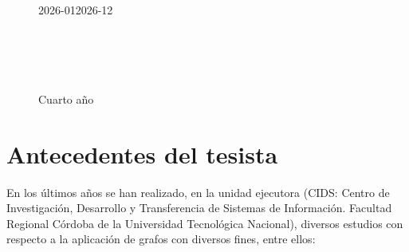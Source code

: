 \documentclass[
	11pt,oneside,a4paper,
	headsepline,footsepline,
	fleqn,
]{memoir}
\begin{document}
\begin{figure}[H]
	\centering
	\begin{ganttchart}[
		title label font=\tiny,
		bar label font=\tiny,
		milestone label font=\tiny,
		y unit chart=0.7cm,
			hgrid,
			vgrid,
			x unit=0.8cm,
			bar/.append style={draw=Black, fill=RoyalBlue!75},
			time slot format=isodate-yearmonth,
			time slot unit=month,
			newline shortcut=true,
			bar label node/.append style={align=right}
		]{2026-01}{2026-12}
		 \\
		\\
		\\
		\\
		\\
	\end{ganttchart}
	\caption*{Cuarto año}
\end{figure}

\section{Antecedentes del tesista}

En los últimos años se han realizado, en la unidad ejecutora (CIDS: Centro de Investigación, Desarrollo y Transferencia de Sistemas de Información. Facultad Regional Córdoba de la Universidad Tecnológica Nacional), diversos estudios con respecto a la aplicación de grafos con diversos fines, entre ellos:
\end{document}
